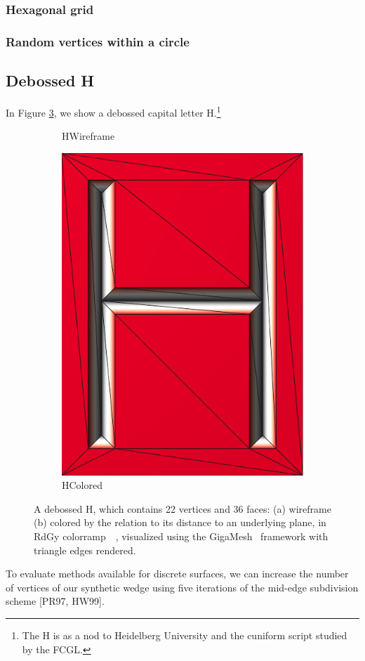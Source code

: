 \documentclass[openany]{book}
\begin{document}
\subsubsection{Hexagonal grid}
\subsubsection{Random vertices within a circle}



\subsection{Debossed H}
In Figure \ref{fig:h}, we show a debossed capital letter H.\footnote{The H is 
as a nod to Heidelberg University and the cuniform script studied by the FCGL.}
\begin{figure}[ht]
\centering
	\begin{subfigure}{.48\linewidth}
		\centering
		\resizebox{0.48\linewidth}{!}{}
		\caption{HWireframe}\label{fig:h.a}
	\end{subfigure}
	\hfill
	\begin{subfigure}{.48\linewidth}
		\centering
		\includegraphics[width=0.48\linewidth]{data/synthetic_meshes/h_colored.png}
		\caption{HColored}\label{fig:h.b}
	\end{subfigure}
	\caption[A debossed H, which contains 22 vertices and 36 faces.]{A debossed H, 
	which contains 22 vertices and 36 faces: (a) wireframe (b) colored by the 
	relation to its distance to an underlying plane, in RdGy 
	colorramp~\cite[p.~???]{Brewer2003}~\cite[p.~19]{Giga17}, visualized using the 
	GigaMesh~\cite{Mara10} framework with triangle edges rendered.}\label{fig:h}
\end{figure}
To evaluate methods available for discrete surfaces, we can increase the number 
of vertices of our synthetic wedge using five iterations of the mid-edge 
subdivision scheme [PR97,
HW99].~\cite[p.~38]{Mara12}
\end{document}
